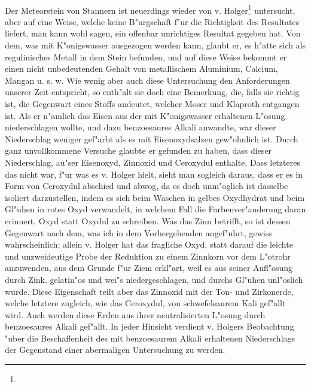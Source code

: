 \documentclass[a4paper, 11pt, oneside]{article}
\begin{document}
\paragraph{}
Der Meteorstein von Stannern ist neuerdings wieder von v. Holger\footnote{} untersucht, aber auf eine Weise, welche keine B"urgschaft f"ur die Richtigkeit des Resultates liefert, man kann wohl sagen, ein offenbar unrichtiges Resultat gegeben hat. Von dem, was mit K"onigswasser ausgezogen werden kann, glaubt er, es h"atte sich als regulinisches Metall in dem Stein befunden, und auf diese Weise bekommt er einen nicht unbedeutenden Gehalt von metallischem Aluminium, Calcium, Mangan u. s. w. Wie wenig aber auch diese Untersuchung den Anforderungen unserer Zeit entspricht, so enth"alt sie doch eine Bemerkung, die, falls sie richtig ist, die Gegenwart eines Stoffs andeutet, welcher Moser und Klaproth entgangen ist. Als er n"amlich das Eisen aus der mit K"onigswasser erhaltenen L"osung niederschlagen wollte, und dazu benzoesaures Alkali anwandte, war dieser Niederschlag weniger gef"arbt als es mit Eisenoxydsalzen gew"ohnlich ist. Durch ganz unvollkommene Versuche glaubte er gefunden zu haben, dass dieser Niederschlag, au"ser Eisenoxyd, Zinnoxid und Ceroxydul enthalte. Dass letzteres das nicht war, f"ur was es v. Holger hielt, sieht man sogleich daraus, dass er es in Form von Ceroxydul abschied und abwog, da es doch unm"oglich ist dasselbe isoliert darzustellen, indem es sich beim Waschen in gelbes Oxydhydrat und beim Gl"uhen in rotes Oxyd verwandelt, in welchem Fall die Farbenver"anderung daran erinnert, Oxyd statt Oxydul zu schreiben. Was das Zinn betrifft, so ist dessen Gegenwart nach dem, was ich in dem Vorhergehenden angef"uhrt, gewiss wahrscheinlich; allein v. Holger hat das fragliche Oxyd, statt darauf die leichte und unzweideutige Probe der Reduktion zu einem Zinnkorn vor dem L"otrohr anzuwenden, aus dem Grunde f"ur Ziem erkl"art, weil es aus seiner Aufl"osung durch Zink. gelatin"os und wei"s niedergeschlagen, und durchs Gl"uhen unl"oslich wurde. Diese Eigenschaft teilt aber das Zinnoxid mit der Ton- und Zirkonerde, welche letztere zugleich, wie das Ceroxydul, von schwefelsaurem Kali gef"allt wird. Auch werden diese Erden aus ihrer neutralisierten L"osung durch benzoesaures Alkali gef"allt. In jeder Hinsicht verdient v. Holgers Beobachtung "uber die Beschaffenheit des mit benzoesaurem Alkali erhaltenen Niederschlags der Gegenstand einer abermaligen Untersuchung zu werden.
\end{document}
